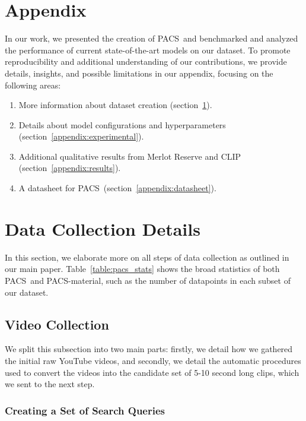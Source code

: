 \documentclass[runningheads]{llncs}
\newcommand{\names}{\textsc{PACS}}
\begin{document}
\clearpage




\clearpage

\section*{Appendix}

\appendix
In our work, we presented the creation of \names\ and benchmarked and analyzed the performance of current state-of-the-art models on our dataset. To promote reproducibility and additional understanding of our contributions, we provide details, insights, and possible limitations in our appendix, focusing on the following areas:
\begin{enumerate}
    \item More information about dataset creation (section~\ref{appendix:data}).
    \item Details about model configurations and hyperparameters (section~\ref{appendix:experimental}).
    \item Additional qualitative results from Merlot Reserve and CLIP (section~\ref{appendix:results}).
    \item A datasheet for \names\ (section~\ref{appendix:datasheet}).
\end{enumerate}


\section{Data Collection Details}
\label{appendix:data}

In this section, we elaborate more on all  steps of data collection as outlined in our main paper. Table~\ref{table:pacs_stats} shows the broad statistics of both \names\ and \names-material, such as the number of datapoints in each subset of our dataset. 

\subsection{Video Collection}
\label{appendix:data1}

We split this subsection into two main parts: firstly, we detail how we gathered the initial raw YouTube videos, and secondly, we detail the automatic procedures used to convert the videos into the candidate set of 5-10 second long clips, which we sent to the next step. 

\subsubsection{Creating a Set of Search Queries}
\end{document}
